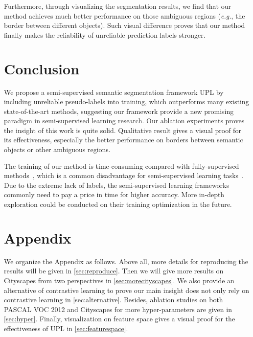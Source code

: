 \documentclass[10pt, twocolumn, letterpaper]{article}
\begin{document}
Furthermore, through visualizing the segmentation results, we find that our method achieves much better performance on those ambiguous regions (\textit{e.g.}, the border between different objects).
Such visual difference proves that our method finally makes the reliability of unreliable prediction labels stronger.


\section{Conclusion}\label{sec:conclusion}
We propose a semi-supervised semantic segmentation framework UPL by including unreliable pseudo-labels into training,
which outperforms many existing state-of-the-art methods, suggesting our framework provide a new promising paradigm in semi-supervised learning research.
Our ablation experiments proves the insight of this work is quite solid.
Qualitative result gives a visual proof for its effectiveness, especially the better performance on borders between semantic objects or other ambiguous regions.

The training of our method is time-consuming compared with fully-supervised methods~\cite{fcn, unet, deeplabv3p, deeplab, pspnet}, which is a common disadvantage for semi-supervised learning tasks~\cite{ael, dars, st++, cps, cct, pc2seg}.
Due to the extreme lack of labels, the semi-supervised learning frameworks commonly need to pay a price in time for higher accuracy.
More in-depth exploration could be conducted on their training optimization in the future.



{\small


}

\appendix
\renewcommand\thefigure{A\arabic{figure}}
\renewcommand\thetable{A\arabic{table}}  
\renewcommand\theequation{A\arabic{equation}}
\setcounter{equation}{0}
\setcounter{table}{0}
\setcounter{figure}{0}


\section*{Appendix}


We organize the Appendix as follows.
Above all, more details for reproducing the results will be given in \cref{sec:reproduce}.
Then we will give more results on Cityscapes from two perspectives in \cref{sec:morecityscapes}.
We also provide an alternative of contrastive learning to prove our main insight does not only rely on contrastive learning in \cref{sec:alternative}.
Besides, ablation studies on both PASCAL VOC 2012 and Cityscapes for more hyper-parameters are given in \cref{sec:hyper}.
Finally, visualization on feature space gives a visual proof for the effectiveness of UPL in \cref{sec:featurespace}.
\end{document}
